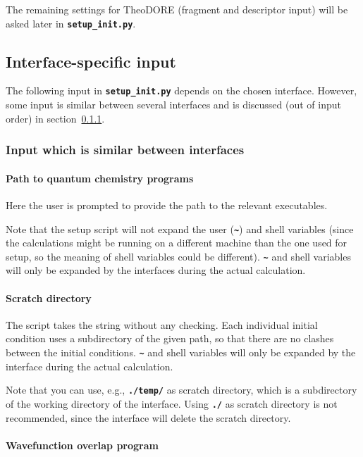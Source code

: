 \documentclass[a4paper,10pt,DIV=15,openany,twoside=false]{scrbook}
\newcommand{\ttt}[1]{\textbf{\texttt{#1}}}
\begin{document}
The remaining settings for TheoDORE (fragment and descriptor input) will be asked later in \ttt{setup\_init.py}.

\subsection{Interface-specific input}

The following input in \ttt{setup\_init.py} depends on the chosen interface.
However, some input is similar between several interfaces and is discussed (out of input order) in section~\ref{sec:setup_init.py:several}.

\subsubsection{Input which is similar between interfaces}\label{sec:setup_init.py:several}

\paragraph{Path to quantum chemistry programs}

Here the user is prompted to provide the path to the relevant executables. 

Note that the setup script will not expand the user (\ttt{\textasciitilde}) and shell variables (since the calculations might be running on a different machine than the one used for setup, so the meaning of shell variables could be different). \ttt{\textasciitilde} and shell variables will only be expanded by the interfaces during the actual calculation.

\paragraph{Scratch directory}

The script takes the string without any checking. Each individual initial condition uses a subdirectory of the given path, so that there are no clashes between the initial conditions. \ttt{\textasciitilde} and shell variables will only be expanded by the interface during the actual calculation.

Note that you can use, e.g., \ttt{./temp/} as scratch directory, which is a subdirectory of the working directory of the interface. Using \ttt{./} as scratch directory is not recommended, since the interface will delete the scratch directory.

\paragraph{Wavefunction overlap program}
\end{document}
